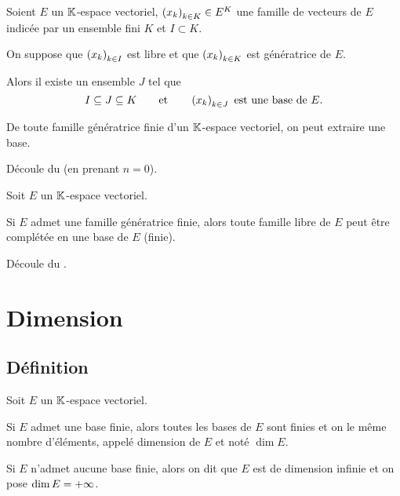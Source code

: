 \begin{theo}[Reformulation]
Soient \(E\) un \(\mathbb{K}\)-espace vectoriel, \(\left(x_k\right)_{k\in K}\in E^K\) une famille de vecteurs de \(E\) indicée par un ensemble fini \(K\) et \(I\subset K\).

On suppose que \(\left(x_k\right)_{k\in I}\) est libre et que \(\left(x_k\right)_{k\in K}\) est génératrice de \(E\).

Alors il existe un ensemble \(J\) tel que \[I\subseteq J\subseteq K\qquad\text{et}\qquad\left(x_k\right)_{k\in J}\text{ est une base de }E.\]
\end{theo}

\begin{cor}
De toute famille génératrice finie d'un \(\mathbb{K}\)-espace vectoriel, on peut extraire une base.
\end{cor}

\begin{dem}
Découle du  (en prenant \(n=0\)).
\end{dem}

\begin{cor}
Soit \(E\) un \(\mathbb{K}\)-espace vectoriel.

Si \(E\) admet une famille génératrice finie, alors toute famille libre de \(E\) peut être complétée en une base de \(E\) (finie).
\end{cor}

\begin{dem}
Découle du .
\end{dem}

\section{Dimension}

\subsection{Définition}

\begin{deftheo}
Soit \(E\) un \(\mathbb{K}\)-espace vectoriel.

Si \(E\) admet une base finie, alors toutes les bases de \(E\) sont finies et on le même nombre d'éléments, appelé dimension de \(E\) et noté \(\dim E\).

Si \(E\) n'admet aucune base finie, alors on dit que \(E\) est de dimension infinie et on pose \(\dim E=+\infty\).
\end{deftheo}

